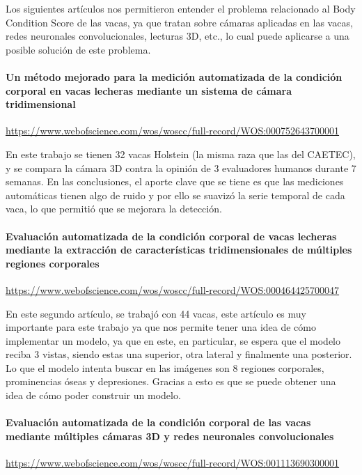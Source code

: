 Los siguientes artículos nos permitieron entender el problema relacionado al Body Condition Score de las vacas, ya que tratan sobre cámaras aplicadas en las vacas, redes neuronales convolucionales, lecturas 3D, etc., lo cual puede aplicarse a una posible solución de este problema.

\paragraph{Un método mejorado para la medición automatizada de la condición corporal en vacas lecheras mediante un sistema de cámara tridimensional}

\url{https://www.webofscience.com/wos/woscc/full-record/WOS:000752643700001}

En este trabajo se tienen 32 vacas Holstein (la misma raza que las del CAETEC), y se compara la cámara 3D contra la opinión de 3 evaluadores humanos durante 7 semanas. En las conclusiones, el aporte clave que se tiene es que las mediciones automáticas tienen algo de ruido y por ello se suavizó la serie temporal de cada vaca, lo que permitió que se mejorara la detección.

\paragraph{Evaluación automatizada de la condición corporal de vacas lecheras mediante la extracción de características tridimensionales de múltiples regiones corporales}

\url{https://www.webofscience.com/wos/woscc/full-record/WOS:000464425700047}

En este segundo artículo, se trabajó con 44 vacas, este artículo es muy importante para este trabajo ya que nos permite tener una idea de cómo implementar un modelo, ya que en este, en particular, se espera que el modelo reciba 3 vistas, siendo estas una superior, otra lateral y finalmente una posterior. Lo que el modelo intenta buscar en las imágenes son 8 regiones corporales, prominencias óseas y depresiones. Gracias a esto es que se puede obtener una idea de cómo poder construir un modelo.

\paragraph{Evaluación automatizada de la condición corporal de las vacas mediante múltiples cámaras 3D y redes neuronales convolucionales}

\url{https://www.webofscience.com/wos/woscc/full-record/WOS:001113690300001}

